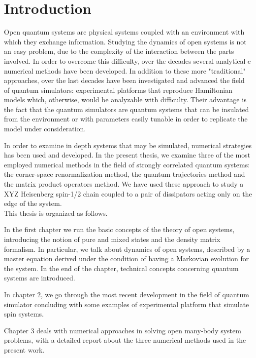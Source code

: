 \chapter*{Introduction}

\label{Introduction}

Open quantum systems are physical systems coupled with an environment with which they exchange information. Studying the dynamics of open systems is not an easy problem, due to the complexity of the interaction between the parts involved. In order to overcome this difficulty, over the decades several analytical e numerical methods have been developed. In addition to these more "traditional" approaches, over the last decades have been investigated and advanced the field of quantum simulators: experimental platforms that reproduce Hamiltonian models which, otherwise, would be analyzable with difficulty. Their advantage is the fact that the quantum simulators are quantum systems that can be insulated from the environment or with parameters easily tunable in order to replicate the model under consideration.

In order to examine in depth systems that may be simulated, numerical strategies has been used and developed. In the present thesis, we examine three of the most employed numerical methods in the field of strongly correlated quantum systems: the corner-space renormalization method, the quantum trajectories method and the matrix product operators method. We have used these approach to study a XYZ Heisenberg spin-1/2 chain coupled to a pair of dissipators acting only on the edge of the system. 
\\


This thesis is organized as follows. 

In the first chapter we run the basic concepts of the theory of open systems, introducing the notion of pure and mixed states and the density matrix formalism. In particular, we talk about dynamics of open systems, described by a master equation derived under the condition of having a Markovian evolution for the system. In the end of the chapter, technical concepts concerning quantum systems are introduced. 

In chapter 2, we go through the most recent development in the field of quantum simulator concluding with some examples of experimental platform that simulate spin systems. 

Chapter 3 deals with numerical approaches in solving open many-body system problems, with a detailed report about the three numerical methods used in the present work. 

